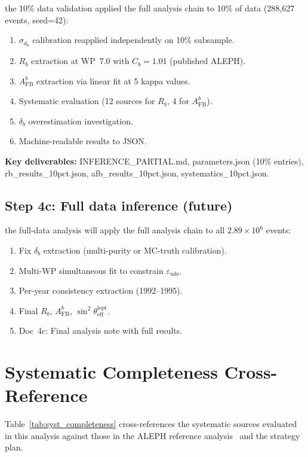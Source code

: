 \documentclass[11pt,a4paper]{article}
\begin{document}
the 10\% data validation applied the full analysis chain to 10\% of data (288,627 events, seed=42):
\begin{enumerate}
\item $\sigma_{d_0}$ calibration reapplied independently on 10\% subsample.
\item $R_b$ extraction at WP~7.0 with $C_b = 1.01$ (published ALEPH).
\item $A_\mathrm{FB}^b$ extraction via linear fit at 5 kappa values.
\item Systematic evaluation (12 sources for $R_b$, 4 for $A_\mathrm{FB}^b$).
\item $\delta_b$ overestimation investigation.
\item Machine-readable results to JSON.
\end{enumerate}

\textbf{Key deliverables:} INFERENCE\_PARTIAL.md, parameters.json (10\% entries),
rb\_results\_10pct.json, afb\_results\_10pct.json, systematics\_10pct.json.

\subsection{Step 4c: Full data inference (future)}

the full-data analysis will apply the full analysis chain to all $2.89 \times 10^6$ events:
\begin{enumerate}
\item Fix $\delta_b$ extraction (multi-purity or MC-truth calibration).
\item Multi-WP simultaneous fit to constrain $\varepsilon_\mathrm{uds}$.
\item Per-year consistency extraction (1992--1995).
\item Final $R_b$, $A_\mathrm{FB}^b$, $\sin^2\theta_\mathrm{eff}^\mathrm{lept}$.
\item Doc~4c: Final analysis note with full results.
\end{enumerate}

\section{Systematic Completeness Cross-Reference}
\label{app:syst_completeness}

Table~\ref{tab:syst_completeness} cross-references the systematic sources evaluated
in this analysis against those in the ALEPH reference analysis~\cite{ALEPH:Rb:1996}
and the strategy plan.
\end{document}
